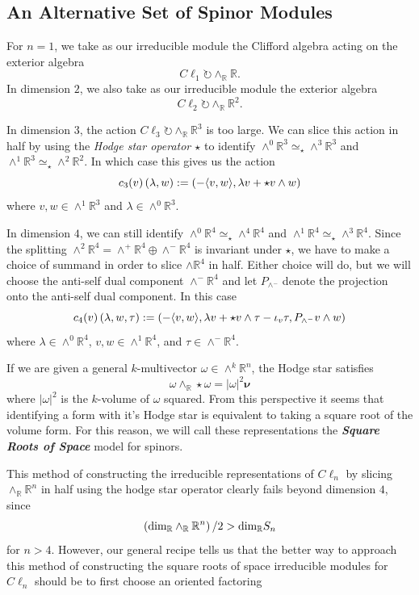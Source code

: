 \documentclass[openany, 11pt]{article}
\theoremstyle{definition}
\theoremstyle{remark}
\def\la{\ensuremath{\langle}}
\def\ra{\ensuremath{\rangle}}
\def\lp{\ensuremath{\left(}}
\def\rp{\ensuremath{\right)}}
\def\bR{\ensuremath{\mathbb{R}}}
\begin{document}
\subsection{An Alternative Set of Spinor Modules}
For $n=1$, we take as our irreducible module the Clifford algebra acting on the exterior algebra 
\[
    C\ell_1\circlearrowright\wedge_{\bR}\bR.
\]
In dimension $2$, we also take as our irreducible module the exterior algebra
\[
    C\ell_2\circlearrowright\wedge_{\bR}\bR^2.
\]\par
In dimension $3$, the action $C\ell_3\circlearrowright\wedge_{\bR}\bR^3$ is too large. We can slice this action in half by using the \emph{Hodge star operator $\star$} to identify $\wedge^0\bR^3\simeq_{\star}\wedge^3\bR^3$ and $\wedge^1\bR^3\simeq_{\star}\wedge^2\bR^2$. In which case this gives us the action
\[
    c_3(v)\lp\lambda,w\rp:=\lp -\la v,w\ra,\lambda v+\star v\wedge w\rp
\]
where $v,w\in\wedge^1\bR^3$ and $\lambda\in\wedge^0\bR^3$.\par
In dimension $4$, we can still identify $\wedge^0\bR^4\simeq_{\star}\wedge^4\bR^4$ and $\wedge^1\bR^4\simeq_{\star}\wedge^3\bR^4$. Since the splitting $\wedge^2\bR^4=\wedge^+\bR^4\oplus\wedge^-\bR^4$ is invariant under $\star$, we have to make a choice of summand in order to slice $\wedge\bR^4$ in half. Either choice will do, but we will choose the anti-self dual component $\wedge^-\bR^4$ and let $P_{\wedge^-}$ denote the projection onto the anti-self dual component. In this case
\[
    c_4(v)\lp\lambda,w,\tau\rp:=\lp-\la v,w\ra,\lambda v+\star v\wedge\tau-\iota_v\tau,P_{\wedge^-}v\wedge w\rp
\]
where $\lambda\in\wedge^0\bR^4$, $v,w\in\wedge^1\bR^4$, and $\tau\in\wedge^-\bR^4$.\par
If we are given a general $k$-multivector $\omega\in\wedge^k\bR^n$, the Hodge star satisfies
\[
    \omega\wedge_{\bR}\star\omega=|\omega|^2\boldsymbol{\nu}
\]
where $|\omega|^2$ is the $k$-volume of $\omega$ squared. From this perspective it seems that identifying a form with it's Hodge star is equivalent to taking a square root of the volume form. For this reason, we will call these representations the \textbf{\emph{Square Roots of Space}} model for spinors.\par
This method of constructing the irreducible representations of $C\ell_n$ by slicing $\wedge_{\bR}\bR^n$ in half using the hodge star operator clearly fails beyond dimension $4$, since 
\[
    \lp\text{dim}_{\bR}\wedge_{\bR}\bR^n\rp/2>\text{dim}_{\bR} S_n
\]
for $n>4$. However, our general recipe tells us that the better way to approach this method of constructing the square roots of space irreducible modules for $C\ell_n$ should be to first choose an oriented factoring 
\end{document}
